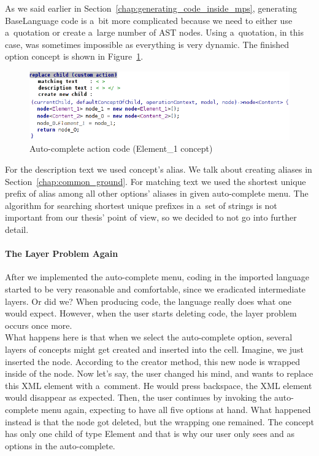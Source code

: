 As we said earlier in Section~\ref{chap:generating_code_inside_mps}, generating BaseLanguage code is a~bit more complicated because we need to either use a~quotation or create a~large number of AST nodes.
Using a~quotation, in this case, was sometimes impossible as everything is very dynamic.
The finished option concept is shown in Figure~\ref{fig:autocomplete_action}.

\begin{figure}[h]
	\centering
	\includegraphics[width=\textwidth]{./img/autocomplete_action.png}
	\caption{Auto-complete action code (Element{\_}1 concept)}
	\label{fig:autocomplete_action}
\end{figure}

For the description text we used concept's alias.
We talk about creating aliases in Section~\ref{chap:common_ground}.
For matching text we used the shortest unique prefix of alias among all other options' aliases in given auto-complete menu.
The algorithm for searching shortest unique prefixes in a~set of strings is not important from our thesis' point of view, so we decided to not go into further detail.


\paragraph{The Layer Problem Again}

After we implemented the auto-complete menu, coding in the imported language started to be very reasonable and comfortable, since we eradicated intermediate layers.
Or did we?
When producing code, the language really does what one would expect.
However, when the user starts deleting code, the layer problem occurs once more.
\\

What happens here is that when we select the auto-complete option, several layers of concepts might get created and inserted into the cell.
Imagine, we just inserted the  node.
According to the creator method, this new node is wrapped inside of the  node.
Now let's say, the user changed his mind, and wants to replace this XML element with a~comment.
He would press backspace, the XML element would disappear as expected.
Then, the user continues by invoking the auto-complete menu again, expecting to have all five options at hand.
What happened instead is that the  node got deleted, but the wrapping  one remained.
The  concept has only one child of type Element and that is why our user only sees  and  as options in the auto-complete.


